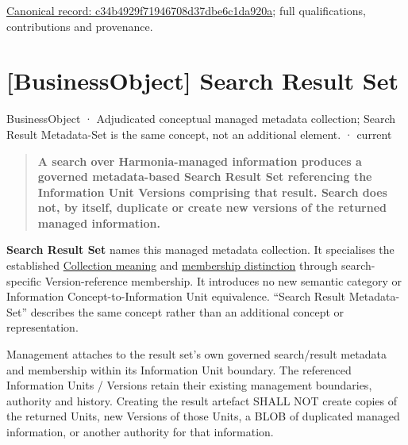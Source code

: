 {\footnotesize \href{../../../../continuum/business/business-object/c34b4929f71946708d37dbe6c1da920a.md}{Canonical record: c34b4929f71946708d37dbe6c1da920a}; full qualifications, contributions and provenance.}\par
\section{[BusinessObject] Search Result Set}

\label{element:b683ae87c72a4c16aba948a4b8cb0998}
{\small BusinessObject · Adjudicated conceptual managed metadata collection; Search Result Metadata-Set is the same concept, not an additional element. · current}\par

\begin{quote}


\textbf{A search over Harmonia-managed information produces a governed
metadata-based Search Result Set referencing the Information Unit Versions
comprising that result. Search does not, by itself, duplicate or create new
versions of the returned managed information.}



\end{quote}


\textbf{Search Result Set} names this managed metadata collection. It specialises
the established \href{\detokenize{../../../../../docs/markdown/04-information-architecture/metamodel/information-architecture-metamodel.md#21-semantic-classifications}}{Collection meaning}
and \href{\detokenize{../../../../../docs/markdown/04-information-architecture/patterns/containment-and-collections.md#3-collections-vs-containment-distinct-semantics}}{membership distinction}
through search-specific Version-reference membership. It introduces no new
semantic category or Information Concept-to-Information Unit equivalence.
“Search Result Metadata-Set” describes the same concept rather than an
additional concept or representation.



Management attaches to the result set's own governed search/result metadata
and membership within its Information Unit boundary. The referenced
Information Units / Versions retain their existing management boundaries,
authority and history. Creating the result artefact SHALL NOT create copies
of the returned Units, new Versions of those Units, a BLOB of duplicated
managed information, or another authority for that information.



